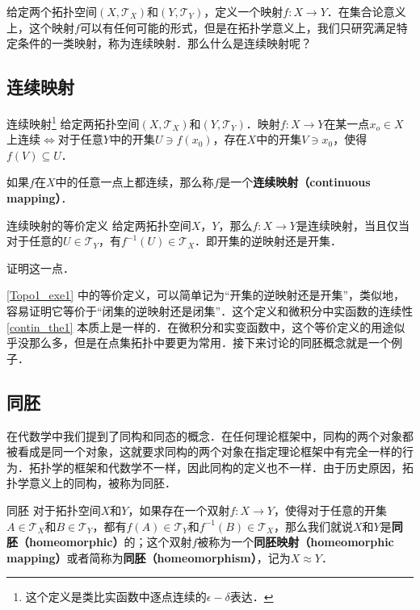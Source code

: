 

给定两个拓扑空间$(X, \mathcal{T}_X)$和$(Y, \mathcal{T}_Y)$，定义一个映射$f:X\rightarrow Y$．在集合论意义上，这个映射$f$可以有任何可能的形式，但是在拓扑学意义上，我们只研究满足特定条件的一类映射，称为连续映射．那么什么是连续映射呢？

\subsection{连续映射}
\begin{definition}{连续映射\footnote{这个定义是类比实函数中逐点连续的$\epsilon-\delta$表达．}}
给定两拓扑空间$(X, \mathcal{T}_X)$和$(Y, \mathcal{T}_Y)$．映射$f:X\rightarrow Y$在某一点$x_o\in X$上连续$\iff$对于任意$Y$中的开集$U\ni f(x_0)$，存在$X$中的开集$V\ni x_0$，使得$f(V)\subseteq U$．

如果$f$在$X$中的任意一点上都连续，那么称$f$是一个\textbf{连续映射（continuous mapping）}．
\end{definition}

\begin{exercise}{连续映射的等价定义}\label{Topo1_exe1}
给定两拓扑空间$X$，$Y$，那么$f:X\rightarrow Y$是连续映射，当且仅当对于任意的$U\in\mathcal{T}_Y$，有$f^{-1}(U)\in\mathcal{T}_X$．即开集的逆映射还是开集．

证明这一点．
\end{exercise}

\autoref{Topo1_exe1} 中的等价定义，可以简单记为“开集的逆映射还是开集”，类似地，容易证明它等价于“闭集的逆映射还是闭集”．这个定义和微积分中实函数的连续性\autoref{contin_the1} 本质上是一样的．在微积分和实变函数中，这个等价定义的用途似乎没那么多，但是在点集拓扑中要更为常用．接下来讨论的同胚概念就是一个例子．

\subsection{同胚}

在代数学中我们提到了同构和同态的概念．在任何理论框架中，同构的两个对象都被看成是同一个对象，这就要求同构的两个对象在指定理论框架中有完全一样的行为．拓扑学的框架和代数学不一样，因此同构的定义也不一样．由于历史原因，拓扑学意义上的同构，被称为同胚．

\begin{definition}{同胚}
对于拓扑空间$X$和$Y$，如果存在一个双射$f:X\rightarrow Y$，使得对于任意的开集$A\in\mathcal{T}_X$和$B\in\mathcal{T}_Y$，都有$f(A)\in\mathcal{T}_Y$和$f^{-1}(B)\in\mathcal{T}_X$，那么我们就说$X$和$Y$是\textbf{同胚（homeomorphic）}的；这个双射$f$被称为一个\textbf{同胚映射（homeomorphic mapping）}或者简称为\textbf{同胚（homeomorphism）}，记为$X\approx Y$．
\end{definition}

